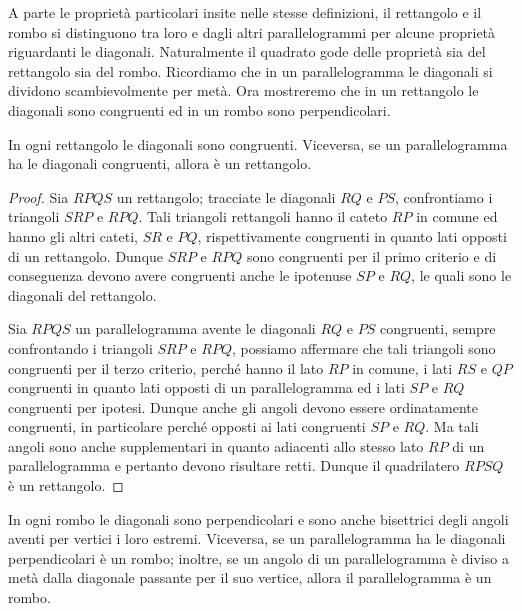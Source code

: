 A parte le proprietà particolari insite nelle stesse definizioni, il 
rettangolo e il rombo si distinguono tra loro e dagli altri 
parallelogrammi per alcune proprietà riguardanti le diagonali. 
Naturalmente il quadrato gode delle proprietà sia del rettangolo sia 
del rombo.
Ricordiamo che in un parallelogramma le diagonali si dividono 
scambievolmente per metà. Ora mostreremo che in un rettangolo le 
diagonali sono congruenti ed in un rombo sono perpendicolari.

\begin{teorema}
  In ogni rettangolo le diagonali sono congruenti. Viceversa, se un 
  parallelogramma ha le diagonali congruenti, allora è un rettangolo.
\end{teorema}


\begin{inaccessibleblock}
  \begin{figure}[htb]
    \centering
  \end{figure}
\end{inaccessibleblock}

\begin{proof}
  Sia $RPQS$ un rettangolo; tracciate le diagonali $RQ$ e $PS$, 
  confrontiamo i triangoli $SRP$ e $RPQ$. Tali triangoli rettangoli 
  hanno il cateto $RP$ in comune ed hanno gli altri cateti, $SR$ e 
  $PQ$, rispettivamente congruenti in quanto lati opposti di un 
  rettangolo. Dunque $SRP$ e $RPQ$ sono congruenti per il primo criterio 
  e di conseguenza devono avere congruenti anche le ipotenuse $SP$ e 
  $RQ$, le quali sono le diagonali del rettangolo.
  
  Sia $RPQS$ un parallelogramma avente le diagonali $RQ$ e $PS$ 
  congruenti, sempre confrontando i triangoli $SRP$ e $RPQ$, possiamo 
  affermare che tali triangoli sono congruenti per il terzo criterio, 
  perché hanno il lato $RP$ in comune, i lati $RS$ e $QP$ congruenti in 
  quanto lati opposti di un parallelogramma ed i lati $SP$ e $RQ$ 
  congruenti per ipotesi. Dunque anche gli angoli devono essere 
  ordinatamente congruenti, in particolare  perché opposti ai lati 
  congruenti $SP$ e $RQ$. Ma tali angoli sono anche supplementari in 
  quanto adiacenti allo stesso lato $RP$ di un parallelogramma e 
  pertanto devono risultare retti. Dunque il quadrilatero $RPSQ$ è un 
  rettangolo.
\end{proof}

\begin{teorema}
  In ogni rombo le diagonali sono perpendicolari e sono anche 
  bisettrici degli angoli aventi per vertici i loro estremi. Viceversa, 
  se un parallelogramma ha le diagonali perpendicolari è un rombo; 
  inoltre, se un angolo di un parallelogramma è diviso a metà dalla 
  diagonale passante per il suo vertice, allora il parallelogramma è un 
  rombo.
\end{teorema}


